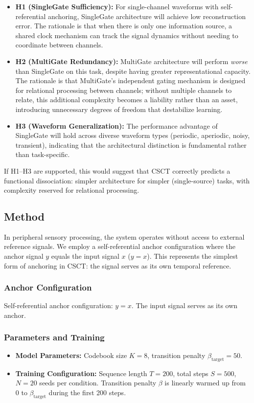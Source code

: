 \documentclass{article}
\begin{document}
\begin{itemize}
    \item \textbf{H1 (SingleGate Sufficiency):} For single-channel waveforms with self-referential anchoring, SingleGate architecture will achieve low reconstruction error. The rationale is that when there is only one information source, a shared clock mechanism can track the signal dynamics without needing to coordinate between channels.
    
    \item \textbf{H2 (MultiGate Redundancy):} MultiGate architecture will perform \textit{worse} than SingleGate on this task, despite having greater representational capacity. The rationale is that MultiGate's independent gating mechanism is designed for relational processing between channels; without multiple channels to relate, this additional complexity becomes a liability rather than an asset, introducing unnecessary degrees of freedom that destabilize learning.
    
    \item \textbf{H3 (Waveform Generalization):} The performance advantage of SingleGate will hold across diverse waveform types (periodic, aperiodic, noisy, transient), indicating that the architectural distinction is fundamental rather than task-specific.
\end{itemize}

If H1--H3 are supported, this would suggest that CSCT correctly predicts a functional dissociation: simpler architecture for simpler (single-source) tasks, with complexity reserved for relational processing.

\subsection{Method}
In peripheral sensory processing, the system operates without access to external reference signals. We employ a self-referential anchor configuration where the anchor signal $y$ equals the input signal $x$ ($y=x$). This represents the simplest form of anchoring in CSCT: the signal serves as its own temporal reference.

\subsubsection{Anchor Configuration}
Self-referential anchor configuration: $y = x$. The input signal serves as its own anchor.

\subsubsection{Parameters and Training}
\begin{itemize}
    \item \textbf{Model Parameters:} Codebook size $K=8$, transition penalty $\beta_{\mathrm{target}}=50$.
    \item \textbf{Training Configuration:} Sequence length $T=200$, total steps $S=500$, $N=20$ seeds per condition. Transition penalty $\beta$ is linearly warmed up from $0$ to $\beta_{\mathrm{target}}$ during the first 200 steps.
\end{itemize}
\end{document}

